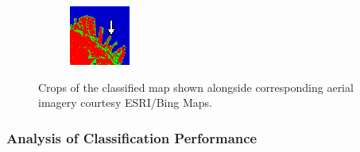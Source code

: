\begin{figure}[!b]
\begin{subfigure}[t]{0.19\textwidth}
\vspace{0.2cm}
\includegraphics[width=\columnwidth]{Figures/ALOS2_SF_3Class/Jetty}
\caption{}
\label{fig:cla2_f}
\end{subfigure} %
\caption{Crops of the classified map shown alongside corresponding aerial imagery courtesy ESRI/Bing Maps.}
\label{fig:cl_crop_alos2}
\end{figure}




\subsubsection{Analysis of Classification Performance}
\label{sec:EXPT2}





